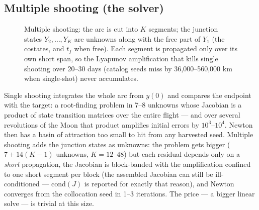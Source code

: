 \documentclass[11pt]{article}
\newcommand{\tf}{t_f}\newcommand{\R}{\mathbb{R}}
\begin{document}
\subsection{Multiple shooting (the solver)}\label{sec:ms}
\begin{figure}[t]\centering
{}
\caption{Multiple shooting: the arc is cut into $K$ segments; the junction states $Y_2,\dots,Y_K$ are unknowns along with the free part of $Y_1$ (the costates, and $\tf$ when free). Each segment is propagated only over its own short span, so the Lyapunov amplification that kills single shooting over 20--30 days (catalog seeds miss by 36,000--560,000 km when single-shot) never accumulates.}
\label{fig:ms}
\end{figure}

\begin{intu}
Single shooting integrates the whole arc from $y(0)$ and compares the endpoint
with the target: a root-finding problem in 7--8 unknowns whose Jacobian is a
product of state transition matrices over the entire flight --- and over
several revolutions of the Moon that product amplifies initial errors by
$10^3$--$10^4$. Newton then has a basin of attraction too small to hit from
any harvested seed. Multiple shooting adds the junction states as unknowns:
the problem gets bigger ($7+14(K-1)$ unknowns, $K=12$--$48$) but each residual
depends only on a \emph{short} propagation, the Jacobian is block-banded with the amplification confined to one short segment per block (the assembled Jacobian can still be ill-conditioned --- cond$(J)$ is reported for exactly that reason), and Newton converges from the collocation seed in 1--3 iterations. The price --- a bigger linear solve --- is trivial at this size.
\end{intu}
\end{document}
